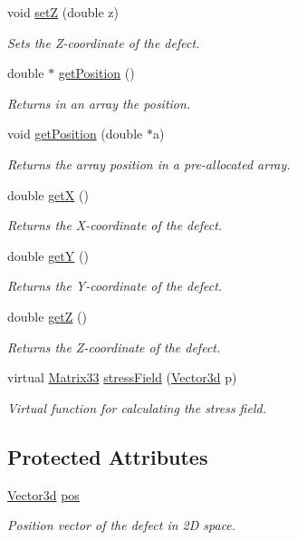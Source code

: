 \begin{DoxyCompactItemize}
void \hyperlink{classDefect_abb0b16c44a1b04d782f5c5f598b49d5b}{set\-Z} (double z)
\begin{DoxyCompactList}\small\item\em Sets the Z-\/coordinate of the defect. \end{DoxyCompactList}\item 
double $\ast$ \hyperlink{classDefect_a6842fba3ad14032766ccf0437afcbced}{get\-Position} ()
\begin{DoxyCompactList}\small\item\em Returns in an array the position. \end{DoxyCompactList}\item 
void \hyperlink{classDefect_aace5c752b85c368631746abc3d5bd714}{get\-Position} (double $\ast$a)
\begin{DoxyCompactList}\small\item\em Returns the array position in a pre-\/allocated array. \end{DoxyCompactList}\item 
double \hyperlink{classDefect_a01b96c453c13db82b5835682e1849dc0}{get\-X} ()
\begin{DoxyCompactList}\small\item\em Returns the X-\/coordinate of the defect. \end{DoxyCompactList}\item 
double \hyperlink{classDefect_a9ea8df3b4c621762a327813056e63911}{get\-Y} ()
\begin{DoxyCompactList}\small\item\em Returns the Y-\/coordinate of the defect. \end{DoxyCompactList}\item 
double \hyperlink{classDefect_a6f59edeca7ca8bfa01c54fd6b1a62374}{get\-Z} ()
\begin{DoxyCompactList}\small\item\em Returns the Z-\/coordinate of the defect. \end{DoxyCompactList}\item 
virtual \hyperlink{classMatrix33}{Matrix33} \hyperlink{classDefect_a2a2c8170e7fa9e2247527291483ce586}{stress\-Field} (\hyperlink{classVector3d}{Vector3d} p)
\begin{DoxyCompactList}\small\item\em Virtual function for calculating the stress field. \end{DoxyCompactList}\end{DoxyCompactItemize}
\subsection*{Protected Attributes}
\begin{DoxyCompactItemize}
\item 
\hyperlink{classVector3d}{Vector3d} \hyperlink{classDefect_aed2731c1beefc22e3db6ad5b18194cdd}{pos}
\begin{DoxyCompactList}\small\item\em Position vector of the defect in 2\-D space. \end{DoxyCompactList}\end{DoxyCompactItemize}


